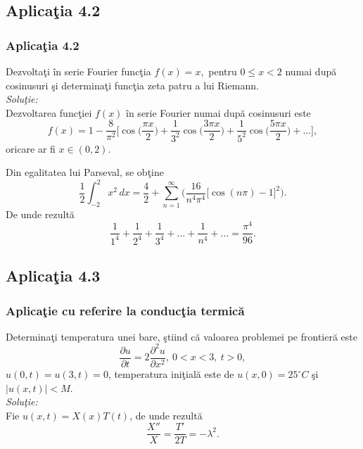 \documentclass{beamer}
\begin{document}
\subsection*{Aplica\c tia 4.2}
\begin{frame}
\frametitle{Aplica\c tia 4.2}
\hspace*{20pt}Dezvolta\c ti \^ in serie Fourier func\c tia $f(x)=x,$ pentru $0 \leq x<2$ numai dup\u a cosinusuri \c si determina\c ti func\c tia zeta patru a lui Riemann.\\
\textit{Solu\c tie:}\\
\hspace*{20pt}Dezvoltarea func\c tiei $f(x)$ \^ in serie Fourier numai dup\u a cosinusuri este
\begin{equation*}
f(x)=1-\frac{8}{\pi^2}\bigg[\cos\bigg(\frac{\pi x}{2}\bigg)+\frac{1}{3^2}\cos\bigg(\frac{3\pi x}{2}\bigg)+\frac{1}{5^2}\cos\bigg(\frac{5\pi x}{2}\bigg)+...\bigg],
\end{equation*}
oricare ar fi $x\in(0,2)$.
\end{frame}

\begin{frame}
\hspace*{20pt}Din egalitatea lui Parseval, se ob\c tine
\begin{equation*}
\frac{1}{2}\int_{-2}^2 x^2 \, dx = \frac{4}{2}+\sum_{n=1}^\infty\bigg(\frac{16}{n^4\pi^4}\Big[\cos(n\pi)-1\Big]^2\bigg).
\end{equation*}
\hspace*{20pt}De unde rezult\u a 
\begin{equation*}
\frac{1}{1^4}+\frac{1}{2^4}+\frac{1}{3^4}+...+\frac{1}{n^4}+...=\frac{\pi^4}{96}.
\end{equation*}
\end{frame}


\subsection*{Aplica\c tia 4.3}
\begin{frame}
\frametitle{Aplica\c tie cu referire la conduc\c tia termic\u a}
\hspace*{20pt}Determina\c ti temperatura unei bare, \c stiind c\u a valoarea problemei pe frontier\u a este
\begin{equation*}
\frac{\partial u}{\partial t}=2\frac{\partial^2u}{\partial x^2}, \: 0<x<3,\: t>0,
\end{equation*} 
$u(0,t)=u(3,t)=0$, temperatura ini\c tial\u a este de $u(x,0)=25^\circ C$ \c si $\left|u(x,t)\right|<M$.\\
\textit{Solu\c tie:}\\
\hspace*{20pt}Fie $u(x,t)=X(x)T(t)$, de unde rezult\u a
\begin{equation*}
\frac{X''}{X}=\frac{T'}{2T}=-\lambda^2. 
\end{equation*}
\end{frame}
\end{document}
